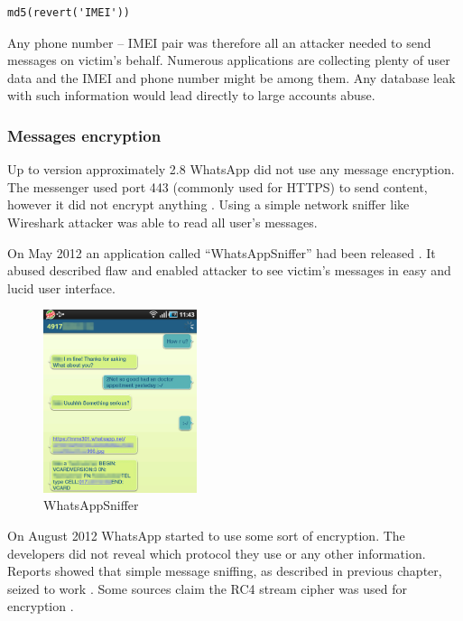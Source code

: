 \documentclass[thesis=M,english]{FITthesis}[2012/10/20]
\begin{document}
\begin{lstlisting}[caption={Pseudo-code of password generation on Android}]
md5(revert('IMEI')) 
\end{lstlisting}

Any phone number -- IMEI pair was therefore all an attacker needed to send messages on victim's behalf. Numerous applications are collecting plenty of user data and the IMEI and phone number might be among them. Any database leak with such information would lead directly to large accounts abuse.

\subsubsection{Messages encryption}

Up to version approximately 2.8 WhatsApp did not use any message encryption. The messenger used port 443 (commonly used for HTTPS) to send content, however it did not encrypt anything \cite{whatsapp-plaintext}. Using a simple network sniffer like Wireshark attacker was able to read all user's messages.

On May 2012 an application called ``WhatsAppSniffer'' had been released  \cite{whatsapp-sniffer}\cite{whatsapp-sniffer2}. It abused described flaw and enabled attacker to see victim's messages in easy and lucid user interface.


\begin{figure}[htb]
	\centering
	\includegraphics[width=0.4\textwidth]{whatsapp-sniffer.png}
	\caption{WhatsAppSniffer \cite{whatsapp-sniffer2}}
	\label{img:whatsapp_sniffer}
\end{figure}


On August 2012 WhatsApp started to use some sort of encryption. The developers did not reveal which protocol they use or any other information. Reports showed that simple message sniffing, as described in previous chapter, seized to work \cite{whatsapp-sniffernomore}. Some sources claim the  RC4 stream cipher was used for encryption \cite{whatsapp-rc4}\cite{whatsapp-rc42}.
\end{document}
